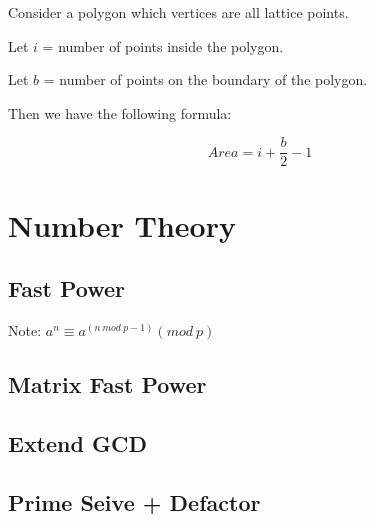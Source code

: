 \documentclass[twocolumn]{article}
\begin{document}
Consider a polygon which vertices are all lattice points.

Let $i$ = number of points inside the polygon.

Let $b$ = number of points on the boundary of the polygon.

Then we have the following formula:

$$
Area = i + \frac{b}{2} - 1
$$

\section{Number Theory}

\subsection{Fast Power}
Note: $a^n \equiv a^{(n \ mod \ p-1)} (mod \ p)$


\subsection{Matrix Fast Power}


\subsection{Extend GCD}


\subsection{Prime Seive + Defactor}

\end{document}
